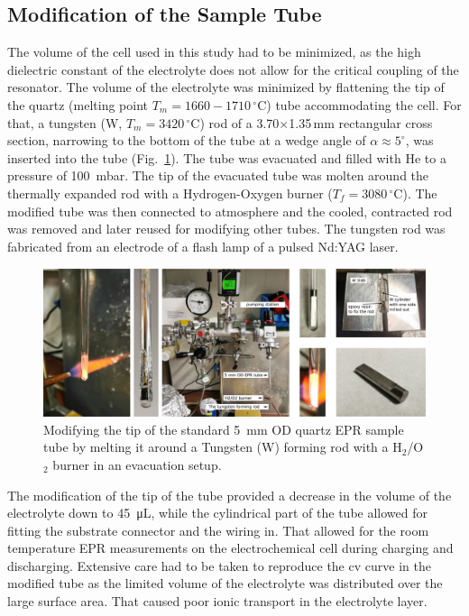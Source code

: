 \subsection{Modification of the Sample Tube}
The volume of the cell used in this study had to be minimized, as the high dielectric constant of the electrolyte does not allow for the critical coupling of the resonator. The volume of the electrolyte was minimized by flattening the tip of the quartz (melting point $T_m=1660-1710\,^{\circ}$C) tube accommodating the cell. For that, a tungsten (W, $T_m=3420\,^{\circ}$C) rod of a 3.70$\times$1.35$\,$mm rectangular cross section, narrowing to the bottom of the tube at a wedge angle of $\alpha \approx 5 ^{\circ}$, was inserted into the tube (Fig.~\ref{fig:S1_modified_tube}). The tube was evacuated and filled with He to a pressure of 100~mbar. The tip of the evacuated tube was molten around the thermally expanded rod with a Hydrogen-Oxygen burner ($T_f = 3080\,^{\circ}$C). The modified tube was then connected to atmosphere and the cooled, contracted rod was removed and later reused for modifying other tubes. The tungsten rod was fabricated from an electrode of a flash lamp of a pulsed Nd:YAG laser.\\

\begin{figure}[h]
\centering
\includegraphics[width=1\textwidth]{./operando_epr/figures/spins_at_work/Figure_S1.pdf}
\caption{Modifying the tip of the standard 5~mm OD quartz EPR sample tube by melting it around a Tungsten (W) forming rod with a H$_2$/O$_2$ burner in an evacuation setup.}
\label{fig:S1_modified_tube}
\end{figure}

The modification of the tip of the tube provided a decrease in the volume of the electrolyte down to \SI{45}{\micro\liter}, while the cylindrical part of the tube allowed for fitting the substrate connector and the wiring in. That allowed for the room temperature EPR measurements on the electrochemical cell during charging and discharging. Extensive care had to be taken to reproduce the cv curve in the modified tube as the limited volume of the electrolyte was distributed over the large surface area. That caused poor ionic transport in the electrolyte layer.\\



